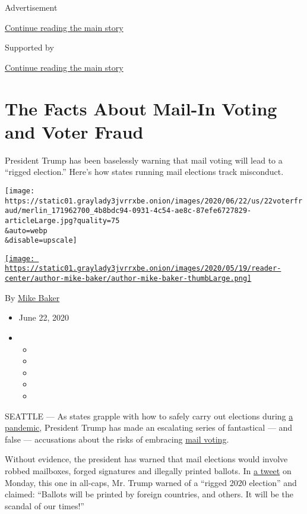 Advertisement

\protect\hyperlink{after-top}{Continue reading the main story}

Supported by

\protect\hyperlink{after-sponsor}{Continue reading the main story}

\hypertarget{the-facts-about-mail-in-voting-and-voter-fraud}{%
\section{The Facts About Mail-In Voting and Voter
Fraud}\label{the-facts-about-mail-in-voting-and-voter-fraud}}

President Trump has been baselessly warning that mail voting will lead
to a ``rigged election.'' Here's how states running mail elections track
misconduct.

\texttt{[image: https://static01.graylady3jvrrxbe.onion/images/2020/06/22/us/22voterfraud/merlin\_171962700\_4b8bdc94-0931-4c54-ae8c-87efe6727829-articleLarge.jpg?quality=75\\\&auto=webp\\\&disable=upscale]}

\href{https://www.nytimes3xbfgragh.onion/by/mike-baker}{\texttt{[image: https://static01.graylady3jvrrxbe.onion/images/2020/05/19/reader-center/author-mike-baker/author-mike-baker-thumbLarge.png]}}

By \href{https://www.nytimes3xbfgragh.onion/by/mike-baker}{Mike Baker}

\begin{itemize}
\item
  June 22, 2020
\item
  \begin{itemize}
  \item
  \item
  \item
  \item
  \item
  \end{itemize}
\end{itemize}

SEATTLE --- As states grapple with how to safely carry out elections
during
\href{https://www.nytimes3xbfgragh.onion/news-event/coronavirus}{a
pandemic}, President Trump has made an escalating series of fantastical
--- and false --- accusations about the risks of embracing
\href{https://www.nytimes3xbfgragh.onion/2020/07/31/us/politics/trump-mail-voting-fraud.html}{mail
voting}.

Without evidence, the president has warned that mail elections would
involve robbed mailboxes, forged signatures and illegally printed
ballots. In
\href{https://twitter.com/realDonaldTrump/status/1275024974579982336}{a
tweet} on Monday, this one in all-caps, Mr. Trump warned of a ``rigged
2020 election'' and claimed: ``Ballots will be printed by foreign
countries, and others. It will be the scandal of our times!''

